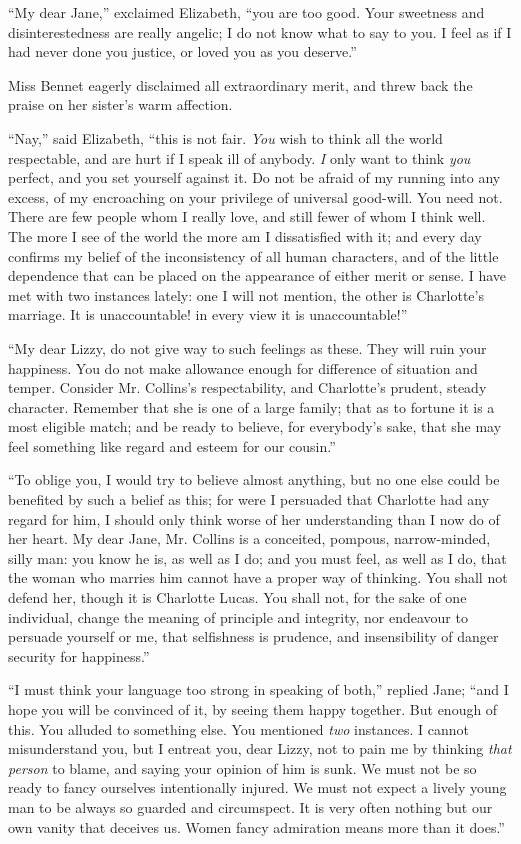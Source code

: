 ``My dear Jane,'' exclaimed Elizabeth, ``you are too good. Your sweetness and disinterestedness are really angelic; I do not know what to say to you. I feel as if I had never done you justice, or loved you as you deserve.''

Miss Bennet eagerly disclaimed all extraordinary merit, and threw back the praise on her sister's warm affection.

``Nay,'' said Elizabeth, ``this is not fair. \textit{You} wish to think all the world respectable, and are hurt if I speak ill of anybody. \textit{I} only want to think \textit{you} perfect, and you set yourself against it. Do not be afraid of my running into any excess, of my encroaching on your privilege of universal good-will. You need not. There are few people whom I really love, and still fewer of whom I think well. The more I see of the world the more am I dissatisfied with it; and every day confirms my belief of the inconsistency of all human characters, and of the little dependence that can be placed on the appearance of either merit or sense. I have met with two instances lately: one I will not mention, the other is Charlotte's marriage. It is unaccountable! in every view it is unaccountable!''

``My dear Lizzy, do not give way to such feelings as these. They will ruin your happiness. You do not make allowance enough for difference of situation and temper. Consider Mr. Collins's respectability, and Charlotte's prudent, steady character. Remember that she is one of a large family; that as to fortune it is a most eligible match; and be ready to believe, for everybody's sake, that she may feel something like regard and esteem for our cousin.''

``To oblige you, I would try to believe almost anything, but no one else could be benefited by such a belief as this; for were I persuaded that Charlotte had any regard for him, I should only think worse of her understanding than I now do of her heart. My dear Jane, Mr. Collins is a conceited, pompous, narrow-minded, silly man: you know he is, as well as I do; and you must feel, as well as I do, that the woman who marries him cannot have a proper way of thinking. You shall not defend her, though it is Charlotte Lucas. You shall not, for the sake of one individual, change the meaning of principle and integrity, nor endeavour to persuade yourself or me, that selfishness is prudence, and insensibility of danger security for happiness.''

``I must think your language too strong in speaking of both,'' replied Jane; ``and I hope you will be convinced of it, by seeing them happy together. But enough of this. You alluded to something else. You mentioned \textit{two} instances. I cannot misunderstand you, but I entreat you, dear Lizzy, not to pain me by thinking \textit{that person} to blame, and saying your opinion of him is sunk. We must not be so ready to fancy ourselves intentionally injured. We must not expect a lively young man to be always so guarded and circumspect. It is very often nothing but our own vanity that deceives us. Women fancy admiration means more than it does.''

